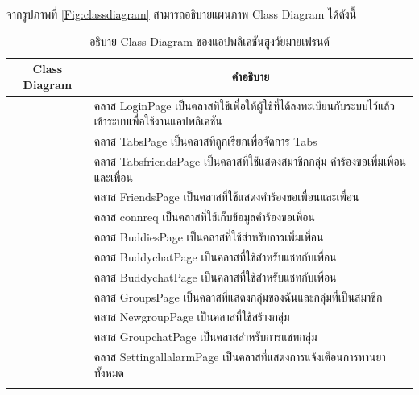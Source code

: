 \newpage	
	จากรูปภาพที่ \ref{Fig:classdiagram} สามารถอธิบายแผนภาพ Class Diagram ได้ดังนี้
	\begin{table}[H]
		\centering
		\caption{อธิบาย Class Diagram ของแอปพลิเคชันสูงวัยมายเฟรนด์}
		\label{tab:class}
		\begin{tabular}{|c|p{10cm}|}
			\hline
			\textbf{Class Diagram} & \multicolumn{1}{c|}{\textbf{คำอธิบาย}} \\ \hline
			\raisebox{-\totalheight}{LoginPage}
			& \setstretch{1.5} {คลาส LoginPage เป็นคลาสที่ใช้เพื่อให้ผู้ใช้ที่ได้ลงทะเบียนกับระบบไว้แล้วเข้าระบบเพื่อใช้งานแอปพลิเคชัน } \\ \hline
			\raisebox{-\totalheight}{TabsPage}
			& \setstretch{1.5} {คลาส TabsPage เป็นคลาสที่ถูกเรียกเพื่อจัดการ Tabs} \\ \hline
			\raisebox{-\totalheight}{TabsfriendsPage}
			& \setstretch{1.5} {คลาส TabsfriendsPage เป็นคลาสที่ใช้แสดงสมาชิกกลุ่ม คำร้องขอเพิ่มเพื่อนและเพื่อน} \\ \hline
			\raisebox{-\totalheight}{FriendsPage}
			& \setstretch{1.5} {คลาส FriendsPage เป็นคลาสที่ใช้แสดงคำร้องขอเพื่อนและเพื่อน} \\ \hline
			\raisebox{-\totalheight}{connreq}
			& \setstretch{1.5} {คลาส connreq เป็นคลาสที่ใช้เก็บข้อมูลคำร้องขอเพื่อน} \\ \hline
			\raisebox{-\totalheight}{BuddiesPage}
			& \setstretch{1.5} {คลาส BuddiesPage เป็นคลาสที่ใช้สำหรับการเพิ่มเพื่อน} \\ \hline
			\raisebox{-\totalheight}{BuddychatPage}
			& \setstretch{1.5} {คลาส BuddychatPage เป็นคลาสที่ใช้สำหรับแชทกับเพื่อน} \\ \hline
			\raisebox{-\totalheight}{BuddychatPage}
			& \setstretch{1.5} {คลาส BuddychatPage เป็นคลาสที่ใช้สำหรับแชทกับเพื่อน} \\ \hline
			\raisebox{-\totalheight}{GroupsPage}
			& \setstretch{1.5} {คลาส GroupsPage เป็นคลาสที่แสดงกลุ่มของฉันและกลุ่มที่เป็นสมาชิก} \\ \hline
			\raisebox{-\totalheight}{NewgroupPage}
			& \setstretch{1.5} {คลาส NewgroupPage เป็นคลาสที่ใช้สร้างกลุ่ม} \\ \hline
			\raisebox{-\totalheight}{GroupchatPage}
			& \setstretch{1.5} {คลาส GroupchatPage เป็นคลาสสำหรับการแชทกลุ่ม} \\ \hline
			\raisebox{-\totalheight}{SettingallalarmPage}
			& \setstretch{1.5} {คลาส SettingallalarmPage เป็นคลาสที่แสดงการแจ้งเตือนการทานยาทั้งหมด} \\ \hline
			\raisebox{-\totalheight}{SettingsalarmPage}

\end{tabular}
\end{table}
